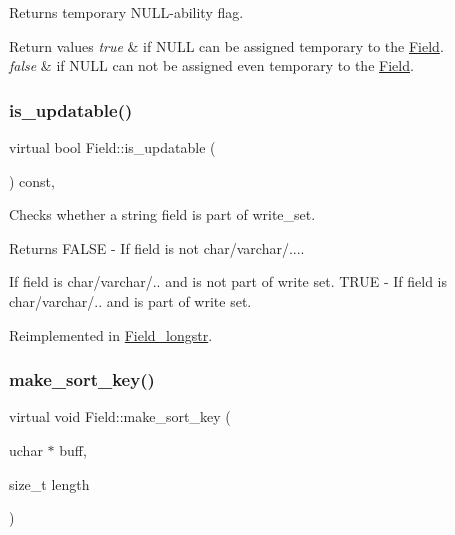 \begin{DoxyReturn}{Returns}
temporary N\+U\+LL-\/ability flag. 
\end{DoxyReturn}

\begin{DoxyRetVals}{Return values}
{\em true} & if N\+U\+LL can be assigned temporary to the \mbox{\hyperlink{classField}{Field}}. \\
\hline
{\em false} & if N\+U\+LL can not be assigned even temporary to the \mbox{\hyperlink{classField}{Field}}. \\
\hline
\end{DoxyRetVals}
\mbox{\label{classField_a8b2061753bd4314da3955b7500119907}} 
\subsubsection{\texorpdfstring{is\+\_\+updatable()}{is\_updatable()}}
{\footnotesize\ttfamily virtual bool Field\+::is\+\_\+updatable (\begin{DoxyParamCaption}{ }\end{DoxyParamCaption}) const\hspace{0.3cm}{\ttfamily [inline]}, {\ttfamily [virtual]}}

Checks whether a string field is part of write\+\_\+set.

\begin{DoxyReturn}{Returns}
F\+A\+L\+SE -\/ If field is not char/varchar/....
\begin{DoxyItemize}
\item If field is char/varchar/.. and is not part of write set. T\+R\+UE -\/ If field is char/varchar/.. and is part of write set. 
\end{DoxyItemize}
\end{DoxyReturn}


Reimplemented in \mbox{\hyperlink{classField__longstr_af0f474a87a0c2c382e117a0d707c142a}{Field\+\_\+longstr}}.

\mbox{\label{classField_af3bc27d237b6ae6ef3dc7a2aec3d79ac}} 
\subsubsection{\texorpdfstring{make\+\_\+sort\+\_\+key()}{make\_sort\_key()}}
{\footnotesize\ttfamily virtual void Field\+::make\+\_\+sort\+\_\+key (\begin{DoxyParamCaption}\item[{uchar $\ast$}]{buff,  }\item[{size\+\_\+t}]{length }\end{DoxyParamCaption})\hspace{0.3cm}{\ttfamily [pure virtual]}}


